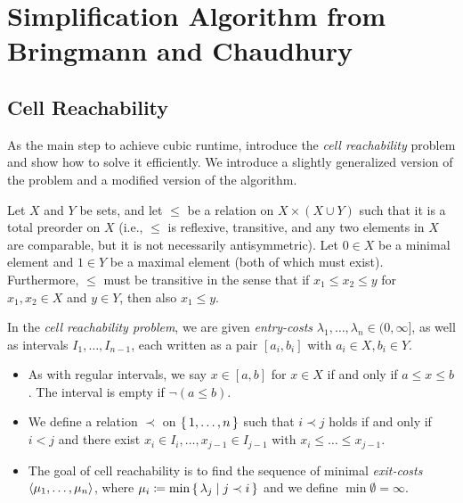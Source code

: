 \section{Simplification Algorithm from Bringmann and Chaudhury}
\label{sec:cubic_algo}


\subsection{Cell Reachability}
\label{ssec:cell_reachability}
As the main step to achieve cubic runtime, \citeauthor{polyline_simplification_has_cubic_complexity_bringmannetal} introduce the \emph{cell reachability} problem and show how to solve it efficiently. We introduce a slightly generalized version of the problem and a modified version of the algorithm. 

\begin{definition}
	Let \(X\) and \(Y\) be sets, and let \(\leq\) be a relation on \(X \times (X \cup Y)\) such that it is a total preorder on \(X\) (i.e., \(\leq\) is reflexive, transitive, and any two elements in \(X\) are comparable, but it is not necessarily antisymmetric). Let \(0 \in X\) be a minimal element and \(1 \in Y\) be a maximal element (both of which must exist). Furthermore, \(\leq\) must be transitive in the sense that if \(x_1 \leq x_2 \leq y\) for \(x_1, x_2 \in X\) and \(y \in Y\), then also \(x_1 \leq y\).

	In the \emph{cell reachability problem}, we are given \emph{entry-costs} \(\lambda_1, \dots, \lambda_n \in (0, \infty]\), as well as intervals \(I_1, \dots, I_{n-1}\), each written as a pair \([a_i, b_i]\) with \(a_i \in X, b_i \in Y\).

	\begin{itemize}
		\item As with regular intervals, we say \(x \in [a, b]\) for \(x \in X\) if and only if \(a \leq x \leq b\). The interval is empty if \(\lnot (a \leq b)\).

		\item We define a relation \(\prec\) on \(\set{1, \dots, n}\) such that \(i \prec j\) holds if and only if \(i < j\) and there exist \(x_i \in I_i, \dots, x_{j-1} \in I_{j-1}\) with \(x_i \leq \dots \leq x_{j - 1}\).

		\item The goal of cell reachability is to find the sequence of minimal \emph{exit-costs} \(\left\langle\mu_1, \dots, \mu_n\right\rangle\), where \(\mu_i \coloneq \min \set{ \lambda_j \mid j \prec i}\) and we define \(\min \emptyset = \infty\).
	\end{itemize}
\end{definition}


